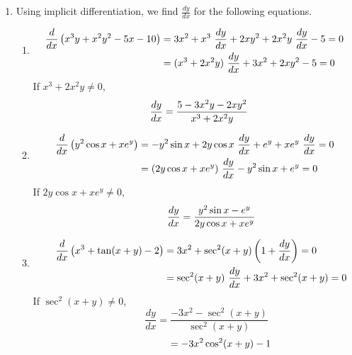 \documentclass[12pt]{amsart}
\begin{document}
\begin{enumerate}
\begin{enumerate}
		\end{enumerate}
		
	\item Using implicit differentiation, we find $\frac{dy}{dx}$ for the following equations. \\
	
		\begin{enumerate}
		
			\item 
				\begin{align}
					\frac{ d} {dx} \left(x^3y+x^2y^2-5x-10 \right) & = 3x^2 +x^3 \text{ } \frac{dy}{dx} + 						2xy^2 + 2x^2y \text{ } \frac{dy}{dx} - 5 = 0 \notag \\
					& = (x^3+2x^2y) \text{ } \frac{dy}{dx}+3x^2+2xy^2-5=0 \notag
				\end{align}
			If $x^3+2x^2y \ne 0$,
			$$\hspace{0.3cm} \frac{dy}{dx} = \frac{5 -3x^2y -2xy^2}{x^3+2x^2y}$$
			
			\item
				\begin{align}
					\frac{ d} {dx} \left(y^2\cos x+xe^y \right) & = -y^2 \sin x + 2y\cos x \text{ } \frac{dy}{dx}						+ e^y + xe^y \text{ } \frac{dy}{dx} = 0 \notag \\
					& = (2y\cos x + xe^y) \text{ } \frac{dy}{dx} - y^2\sin x + e^y = 0 \notag
				\end{align}
			If $2y\cos x + xe^y \ne 0$,
			$$\hspace{1.2cm} \frac{dy}{dx} = \frac{y^2\sin x - e^y}{2y\cos x + xe^y}$$
			
			\item
				\begin{align}
					\hspace{0.5cm} \frac{ d} {dx} \left(x^3+\tan(x+y)-2 \right) & = 3x^2 + \sec^2(x+y)
					\left(1+\frac{dy}{dx} \right) = 0  \notag \\
					& = \sec^2(x+y) \text{ } \frac{dy}{dx} + 3x^2 + \sec^2(x+y) = 0 \notag
				\end{align}
			If $\sec^2(x+y) \ne 0$,
			$$\hspace{1cm} \frac{dy}{dx} = \frac{-3x^2-\sec^2(x+y)}{\sec^2(x+y)}$$
			$$\hspace{1.9cm} = -3x^2\cos^2(x+y) -1$$
			

\end{enumerate}
\end{enumerate}
\end{document}
